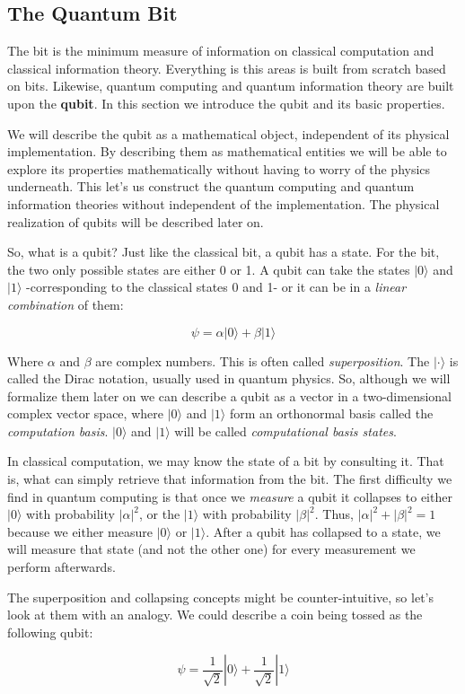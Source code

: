 	\subsection{The Quantum Bit}
	
	The bit is the minimum measure of information on classical computation and classical information theory. Everything is this areas is built from scratch based on bits. Likewise, quantum computing and quantum information theory  are built upon the \textbf{qubit}. In this section we introduce the qubit and its basic properties.
	
	We will describe the qubit as a mathematical object, independent of its physical implementation. By describing them as mathematical entities we will be able to explore its properties mathematically without having to worry of the physics underneath. This let's us construct the quantum computing and quantum information theories without independent of the implementation. The physical realization of qubits will be described later on.
	
	So, what is a qubit? Just like the classical bit, a qubit has a state. For the bit, the two only possible states are either 0 or 1. A qubit can take the states $|0\rangle$ and $|1\rangle$ -corresponding to the classical states 0 and 1- or it can be in a \emph{linear combination} of them:
	
	$$ \psi = \alpha |0\rangle + \beta |1\rangle $$
	
	Where $\alpha$ and $\beta$ are complex numbers. This is often called \emph{superposition}. The $| \cdot \rangle$ is called the Dirac notation, usually used in quantum physics. So, although we will formalize them later on we can describe a qubit as a vector in a two-dimensional complex vector space, where $|0\rangle$ and $|1\rangle$ form an orthonormal basis called the \emph{computation basis}. $|0\rangle$ and $|1\rangle$ will be called \emph{computational basis states}.
	
	In classical computation, we may know the state of a bit by consulting it. That is, what can simply retrieve that information from the bit. The first difficulty we find in quantum computing is that once we \emph{measure} a qubit it collapses to either $|0\rangle$ with probability $|\alpha|^2$, or the $|1\rangle$ with probability $|\beta|^2$. Thus, $|\alpha|^2 + |\beta|^2 = 1$ because we either measure $|0\rangle$ or $|1\rangle$. After a qubit has collapsed to a state, we will measure that state (and not the other one) for every measurement we perform afterwards.
	
	The superposition and collapsing concepts might be counter-intuitive, so let's look at them with an analogy. We could describe a coin being tossed as the following qubit:
	
	$$ \psi = \frac{1}{\sqrt{2}} |0\rangle + \frac{1}{\sqrt{2}} |1\rangle $$
	
	

